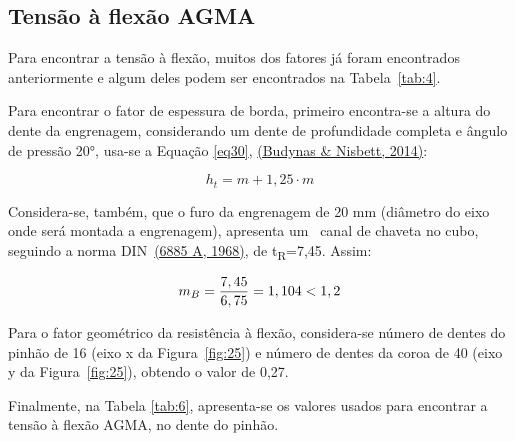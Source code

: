 \documentclass[12pt,a4paper]{article}
\begin{document}
{\label{tensuxe3o-uxe0-flexuxe3o-agma}}

\subsection*{Tensão à flexão AGMA}

{\label{tensuxe3o-uxe0-flexuxe3o-agma}}

Para encontrar a tensão à flexão, muitos dos fatores já foram
encontrados anteriormente e algum deles podem ser encontrados na
Tabela~{\ref{tab:4}}.

Para encontrar o fator de espessura de borda, primeiro encontra-se a
altura do dente da engrenagem, considerando um dente de profundidade
completa e ângulo de pressão 20°, usa-se a Equação
{\ref{eq30}}, \hyperref[csl:20]{(Budynas \& Nisbett, 2014)}:

\par\null

\begin{equation}
\label{eq30}
h_t = m+1,25 \cdot m
\end{equation}



Considera-se, também, que o furo da engrenagem de 20 mm (diâmetro do
eixo onde será montada a engrenagem), apresenta um~ canal de chaveta no
cubo, seguindo a norma DIN~\hyperref[csl:30]{(6885 A, 1968)}, de
t\textsubscript{R}=7,45. Assim:

\begin{equation}
m_{B}=\frac{7,45}{6,75}=1,104<1,2 \nonumber \\
\end{equation}

Para o fator geométrico da resistência à flexão, 
considera-se número de dentes do pinhão de 16 (eixo x da
Figura~{\ref{fig:25}}) e número de dentes da coroa de
40 (eixo y da Figura~{\ref{fig:25}}), obtendo o valor
de 0,27.

Finalmente, na Tabela {\ref{tab:6}}, apresenta-se os
valores usados para encontrar a tensão à flexão AGMA, no dente do
pinhão.
\end{document}
